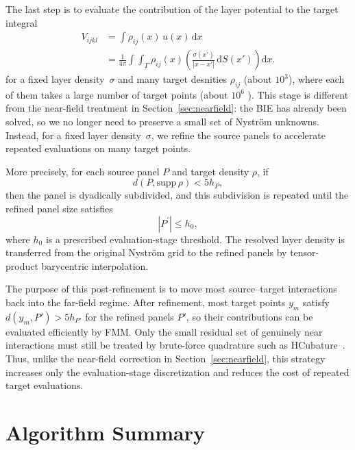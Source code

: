 \documentclass[preprint,12pt]{elsarticle}
\newcommand{\abs}[1]{\left|#1\right|}
\begin{document}
The last step is to evaluate the contribution of the layer potential to the target integral
\begin{equation}
    \begin{split}
        V_{ijkl} &= \int \rho_{ij}(x)\,u(x)\,\mathrm{d}x \\
        & = \frac{1}{4\pi} \int \int_\Gamma \rho_{ij}(x) \left(  \frac{\sigma(x')}{\abs{x-x'}}\, \mathrm{d}S(x') \right) \mathrm{d}x.
    \end{split}
\end{equation}
for a fixed layer density~$\sigma$ and many target desnities $\rho_{ij}$ (about $10^3$), where each of them takes a large number of target points (about $10^6$ ).
This stage is different from the near-field treatment in Section~\ref{sec:nearfield}: the BIE has already been solved, so we no longer need to preserve a small set of Nystr\"om unknowns.
Instead, for a fixed layer density~$\sigma$, we refine the source panels to accelerate repeated evaluations on many target points.

More precisely, for each source panel $P$ and target density $\rho$, if
\begin{equation}
    d(P,\mathrm{supp}\,\rho) < 5h_P,
\end{equation}
then the panel is dyadically subdivided, and this subdivision is repeated until the refined panel size satisfies
\begin{equation}
    \abs{P^\prime} \le h_0,
\end{equation}
where $h_0$ is a prescribed evaluation-stage threshold.
The resolved layer density is transferred from the original Nystr\"om grid to the refined panels by tensor-product barycentric interpolation.

The purpose of this post-refinement is to move most source--target interactions back into the far-field regime.
After refinement, most target points $y_m$ satisfy $d(y_m,P') > 5h_{P'}$ for the refined panels $P'$, so their contributions can be evaluated efficiently by FMM.
Only the small residual set of genuinely near interactions must still be treated by brute-force quadrature such as \mbox{HCubature}~\cite{HCubature}.
Thus, unlike the near-field correction in Section~\ref{sec:nearfield}, this strategy increases only the evaluation-stage discretization and reduces the cost of repeated target evaluations.

\section{Algorithm Summary}
\end{document}
